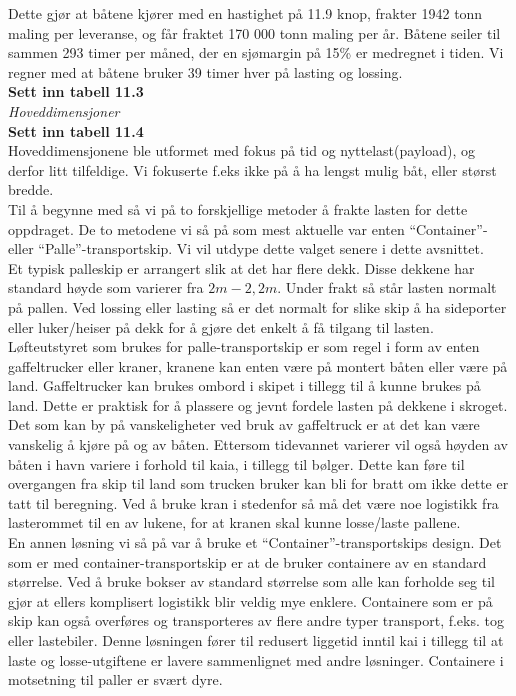 \documentclass[norsk]{article}
\begin{document}
Dette gjør at båtene kjører med en hastighet på 11.9 knop, frakter 1942 tonn maling per leveranse, og får fraktet 170 000 tonn maling per år.  Båtene seiler til sammen 293 timer per måned, der en sjømargin på 15\% er medregnet i tiden. Vi regner med at båtene bruker 39 timer hver på lasting og lossing. \\

\textbf{Sett inn tabell 11.3} \\

\textit{Hoveddimensjoner}\\

\textbf{Sett inn tabell 11.4}\\

Hoveddimensjonene ble utformet med fokus på tid og nyttelast(payload), og derfor litt tilfeldige. Vi fokuserte f.eks ikke på å ha lengst mulig båt, eller størst bredde.\\ 


Til å begynne med så vi på to forskjellige metoder å frakte lasten for dette oppdraget. De to metodene vi så på som mest aktuelle var enten “Container”- eller “Palle”-transportskip. Vi vil utdype dette valget senere i dette avsnittet.\\

Et typisk palleskip er arrangert slik at det har flere dekk. Disse dekkene har standard høyde som varierer fra $2m - 2,2m$. Under frakt så står lasten normalt på pallen. Ved lossing eller lasting så er det normalt for slike skip å ha sideporter eller luker/heiser på dekk for å gjøre det enkelt å få tilgang til lasten. Løfteutstyret som brukes for palle-transportskip er som regel i form av enten gaffeltrucker eller kraner, kranene kan enten være på montert båten eller være på land. Gaffeltrucker kan brukes ombord i skipet i tillegg til å kunne brukes på land. Dette er praktisk for å plassere og jevnt fordele lasten på dekkene i skroget. Det som kan by på vanskeligheter ved bruk av gaffeltruck er at det kan være vanskelig å kjøre på og av båten. Ettersom tidevannet varierer vil også høyden av båten i havn variere i forhold til kaia, i tillegg til bølger. Dette kan føre til overgangen fra skip til land som trucken bruker kan bli for bratt om ikke dette er tatt til beregning. Ved å bruke kran i stedenfor så må det være noe logistikk fra lasterommet til en av lukene, for at kranen skal kunne losse/laste pallene.\\

En annen løsning vi så på var å bruke et “Container”-transportskips design. Det som er med container-transportskip er at de bruker containere av en standard størrelse. Ved å bruke bokser av standard størrelse som alle kan forholde seg til gjør at ellers komplisert logistikk blir veldig mye enklere. Containere som er på skip kan også overføres og transporteres av flere andre typer transport, f.eks. tog eller lastebiler. Denne løsningen fører til redusert liggetid inntil kai i tillegg til at laste og losse-utgiftene er lavere sammenlignet med andre løsninger. Containere i motsetning til paller er svært dyre. \\
\end{document}
